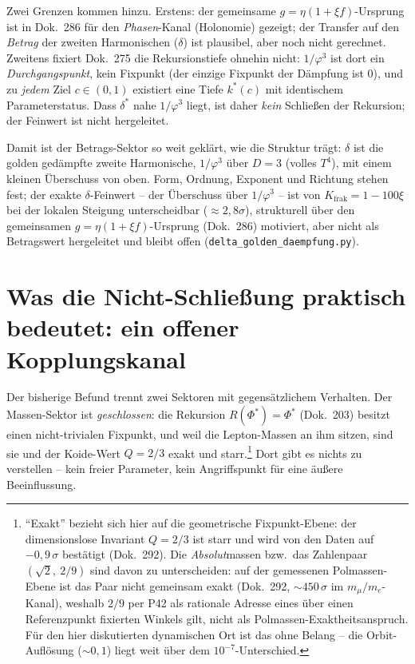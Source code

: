 Zwei Grenzen kommen hinzu. Erstens: der gemeinsame $g=\eta(1+\xi f)$-Ursprung ist in Dok.~286 für
den \emph{Phasen}-Kanal (Holonomie) gezeigt; der Transfer auf den \emph{Betrag} der zweiten
Harmonischen ($\delta$) ist plausibel, aber noch nicht gerechnet. Zweitens fixiert Dok.~275 die
Rekursionstiefe ohnehin nicht: $1/\varphi^3$ ist dort ein \emph{Durchgangspunkt}, kein Fixpunkt (der
einzige Fixpunkt der Dämpfung ist $0$), und zu \emph{jedem} Ziel $c\in(0,1)$ existiert eine Tiefe
$k^*(c)$ mit identischem Parameterstatus. Dass $\delta^*$ nahe $1/\varphi^3$ liegt, ist daher
\emph{kein} Schließen der Rekursion; der Feinwert ist nicht hergeleitet.

Damit ist der Betrags-Sektor so weit geklärt, wie die Struktur trägt: $\delta$ ist die golden
gedämpfte zweite Harmonische, $1/\varphi^3$ über $D=3$ (volles $T^4$), mit einem kleinen
Überschuss von oben. Form, Ordnung, Exponent und Richtung stehen fest; der exakte $\delta$-Feinwert
-- der Überschuss über $1/\varphi^3$ -- ist von $K_{\text{frak}}=1-100\xi$ bei der lokalen Steigung
unterscheidbar ($\approx2{,}8\sigma$), strukturell über den gemeinsamen $g=\eta(1+\xi f)$-Ursprung
(Dok.~286) motiviert, aber nicht als Betragswert hergeleitet und bleibt offen
(\texttt{delta\_golden\_daempfung.py}).

\section{Was die Nicht-Schließung praktisch bedeutet: ein offener Kopplungskanal}
Der bisherige Befund trennt zwei Sektoren mit gegensätzlichem Verhalten. Der Massen-Sektor ist
\emph{geschlossen}: die Rekursion $R(\Phi^*)=\Phi^*$ (Dok.~203) besitzt einen nicht-trivialen
Fixpunkt, und weil die Lepton-Massen an ihm sitzen, sind sie und der Koide-Wert $Q=2/3$ exakt und
starr.\footnote{\enquote{Exakt} bezieht sich hier auf die geometrische Fixpunkt-Ebene: der
dimensionslose Invariant $Q=2/3$ ist starr und wird von den Daten auf $-0{,}9\,\sigma$
bestätigt (Dok.~292). Die \emph{Absolut}massen bzw.\ das Zahlenpaar $(\sqrt2,\ 2/9)$ sind davon
zu unterscheiden: auf der gemessenen Polmassen-Ebene ist das Paar nicht gemeinsam exakt (Dok.~292,
$\sim450\,\sigma$ im $m_\mu/m_e$-Kanal), weshalb $2/9$ per P42 als rationale Adresse eines über
einen Referenzpunkt fixierten Winkels gilt, nicht als Polmassen-Exaktheitsanspruch. Für den hier
diskutierten dynamischen Ort ist das ohne Belang -- die Orbit-Auflösung ($\sim0{,}1$) liegt weit
über dem $10^{-7}$-Unterschied.}
Dort gibt es nichts zu verstellen -- kein freier Parameter, kein Angriffspunkt für eine
äußere Beeinflussung.

